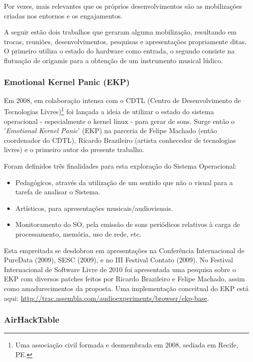 Por vezes, mais relevantes que os próprios desenvolvimentos são as mobilizações
criadas nos entornos e os engajamentos.

A seguir estão dois trabalhos que geraram alguma mobilização,
resultando em trocas, reuniões, desenvolvimentos, pesquisas e
apresentações propriamente ditas. O primeiro utiliza o estado do
hardware como entrada, o segundo consiste na
flutuação de origamis para a obtenção de um instrumento musical
lúdico.


\subsubsection{Emotional Kernel Panic (EKP)}

Em 2008, em colaboração intensa com o CDTL (Centro de
Desenvolvimento de Tecnologias Livres)\footnote{Uma associação
  civil formada e desmembrada em 2008, sediada em Recife, PE.} foi
lançada a ideia de utilizar o estado do sistema operacional -
especialmente o kernel linux - para gerar de sons. Surge então o 
'\emph{Emotional Kernel Panic}' (EKP) na parceria de Felipe
Machado (então coordenador do CDTL),
Ricardo Brazileiro (artista conhecedor de tecnologias livres)
e o primeiro autor do presente trabalho.

Foram definidos três finalidades para esta exploração
do Sistema Operacional:

\begin{itemize}
\item Pedagógicos, através da utilização de um sentido que não o visual para a tarefa de analisar o Sistema.
\item Artísticos, para apresentações musicais/audiovisuais.
\item Monitoramento do SO, pela emissão de sons periódicos relativos à carga de processamento, memória, uso de rede, etc.
\end{itemize}

Esta empreitada se desdobrou em apresentações na Conferência Internacional de PureData (2009), SESC (2009),
e no III Festival Contato (2009). No Festival Internacional de Software Livre de 2010 foi apresentada
uma pesquisa sobre o EKP com diversos patches feitos por Ricardo Brazileiro e Felipe Machado, assim
como amadurecimentos da proposta.
Uma implementação conceitual do EKP está aqui: \url{http://trac.assembla.com/audioexperiments/browser/ekp-base}.



\subsubsection{AirHackTable}

